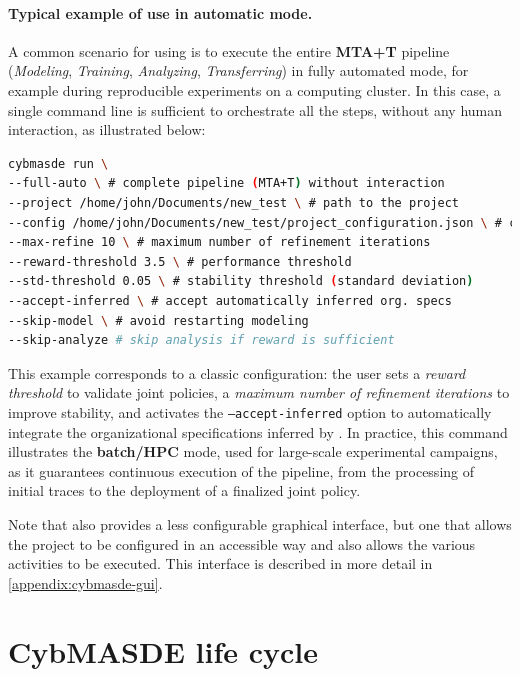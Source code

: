 \medskip
\noindent

\paragraph{Typical example of use in automatic mode.}
A common scenario for using  is to execute the entire \textbf{MTA+T} pipeline (\textit{Modeling}, \textit{Training}, \textit{Analyzing}, \textit{Transferring}) in fully automated mode, for example during reproducible experiments on a computing cluster.
In this case, a single command line is sufficient to orchestrate all the steps, without any human interaction, as illustrated below:

\begin{lstlisting}[language=bash, caption={Complete execution of CybMASDE in full-auto mode}, label={lst:cybmasde_full_auto}]
cybmasde run \
--full-auto \ # complete pipeline (MTA+T) without interaction
--project /home/john/Documents/new_test \ # path to the project
--config /home/john/Documents/new_test/project_configuration.json \ # config file
--max-refine 10 \ # maximum number of refinement iterations
--reward-threshold 3.5 \ # performance threshold
--std-threshold 0.05 \ # stability threshold (standard deviation)
--accept-inferred \ # accept automatically inferred org. specs
--skip-model \ # avoid restarting modeling
--skip-analyze # skip analysis if reward is sufficient
\end{lstlisting}

This example corresponds to a classic configuration: the user sets a \textit{reward threshold} to validate joint policies, a \textit{maximum number of refinement iterations} to improve stability, and activates the \texttt{--accept-inferred} option to automatically integrate the organizational specifications inferred by .
In practice, this command illustrates the \textbf{batch/HPC} mode, used for large-scale experimental campaigns, as it guarantees continuous execution of the pipeline, from the processing of initial traces to the deployment of a finalized joint policy.

Note that  also provides a less configurable graphical interface, but one that allows the project to be configured in an accessible way and also allows the various activities to be executed. This interface is described in more detail in \autoref{appendix:cybmasde-gui}.


\section{CybMASDE life cycle}

